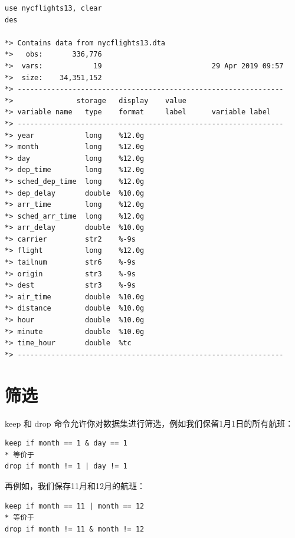 \documentclass[]{ctexbook}
\begin{document}
\begin{lstlisting}
use nycflights13, clear
des

*> Contains data from nycflights13.dta
*>   obs:       336,776                          
*>  vars:            19                          29 Apr 2019 09:57
*>  size:    34,351,152                          
*> ---------------------------------------------------------------
*>               storage   display    value
*> variable name   type    format     label      variable label
*> ---------------------------------------------------------------
*> year            long    %12.0g                
*> month           long    %12.0g                
*> day             long    %12.0g                
*> dep_time        long    %12.0g                
*> sched_dep_time  long    %12.0g                
*> dep_delay       double  %10.0g                
*> arr_time        long    %12.0g                
*> sched_arr_time  long    %12.0g                
*> arr_delay       double  %10.0g                
*> carrier         str2    %-9s                  
*> flight          long    %12.0g                
*> tailnum         str6    %-9s                  
*> origin          str3    %-9s                  
*> dest            str3    %-9s                  
*> air_time        double  %10.0g                
*> distance        double  %10.0g                
*> hour            double  %10.0g                
*> minute          double  %10.0g                
*> time_hour       double  %tc                   
*> ---------------------------------------------------------------
\end{lstlisting}

\hypertarget{section-42}{%
\section{筛选}\label{section-42}}

keep 和 drop 命令允许你对数据集进行筛选，例如我们保留1月1日的所有航班：

\begin{lstlisting}
keep if month == 1 & day == 1
* 等价于
drop if month != 1 | day != 1
\end{lstlisting}

再例如，我们保存11月和12月的航班：

\begin{lstlisting}
keep if month == 11 | month == 12
* 等价于
drop if month != 11 & month != 12
\end{lstlisting}
\end{document}
